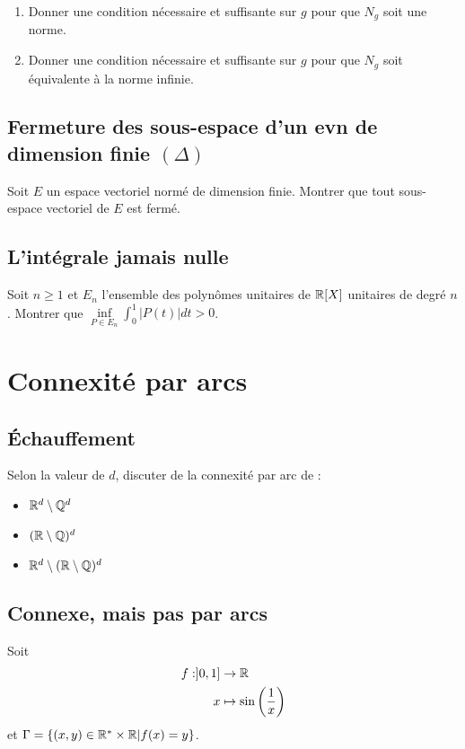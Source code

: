 \begin{enumerate}
    \item Donner une condition nécessaire et suffisante sur $g$ pour que $N_g$ soit une norme.
    
    \item Donner une condition nécessaire et suffisante sur $g$ pour que $N_g$ soit équivalente à la norme infinie.
\end{enumerate}

\subsection{Fermeture des sous-espace d'un evn de dimension finie \texorpdfstring{$(\Delta)$}{Delta}}
Soit $E$ un espace vectoriel normé de dimension finie. Montrer que tout sous-espace vectoriel de $E$ est fermé.

\subsection{L'intégrale jamais nulle}
Soit $n\geqslant 1$ et $E_n$ l'ensemble des polynômes unitaires de $\mathbb{R}[X]$ unitaires de degré $n$. Montrer que $\inf\limits_{P\in E_n} \int_0^1 \vert P(t) \vert dt > 0$.

\section{Connexité par arcs}

\subsection{Échauffement}

Selon la valeur de $d$, discuter de la connexité par arc de :
\begin{itemize}
    \item $\mathbb{R}^d \setminus \mathbb{Q}^d$
    \item $(\mathbb{R}\setminus\mathbb{Q})^d$
    \item $\mathbb{R}^d \setminus (\mathbb{R}\setminus\mathbb{Q})^d$
\end{itemize}

\subsection{Connexe, mais pas par arcs}

Soit 
$$
    \begin{aligned}
        f:]0,1]&\rightarrow \mathbb{R}\\
        x&\mapsto \sin \left(\frac{1}{x}\right)
    \end{aligned}
$$
et $\Gamma = \lbrace (x,y) \in \mathbb{R}^*\times\mathbb{R} \vert f(x)=y \rbrace$.

